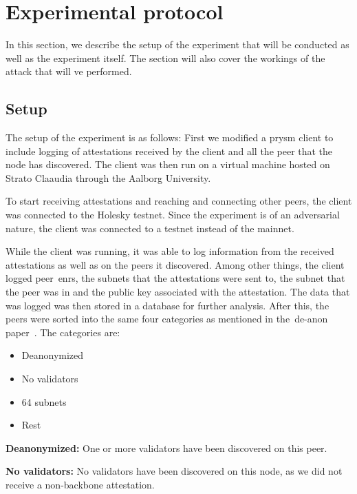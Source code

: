 

\section{Experimental protocol}\label{sec:experimental-protocol}
In this section, we describe the setup of the experiment that will be conducted as well as the experiment itself.
The section will also cover the workings of the attack that will ve performed.

\subsection{Setup}\label{subsec:setup}
The setup of the experiment is as follows: First we modified a prysm client to include logging of attestations received by the client and all the peer that the node has discovered.
The client was then run on a virtual machine hosted on Strato Claaudia through the Aalborg University.

To start receiving attestations and reaching and connecting other peers, the client was connected to the Holesky testnet.
Since the experiment is of an adversarial nature, the client was connected to a testnet instead of the mainnet.

While the client was running, it was able to log information from the received attestations as well as on the peers it discovered.
Among other things, the client logged peer~\glspl{enr}, the subnets that the attestations were sent to, the subnet that the peer was in and the public key associated with the attestation.
The data that was logged was then stored in a database for further analysis.
After this, the peers were sorted into the same four categories as mentioned in the~\gls{de-anon paper}~\cite{heimbach2024deanonymizingethereumvalidatorsp2p}.
The categories are:
\begin{itemize}
    \item Deanonymized
    \item No validators
    \item 64 subnets
    \item Rest
\end{itemize}

\textbf{Deanonymized:} One or more validators have been discovered on this peer.

\textbf{No validators:} No validators have been discovered on this node, as we did not receive a non-backbone attestation.

